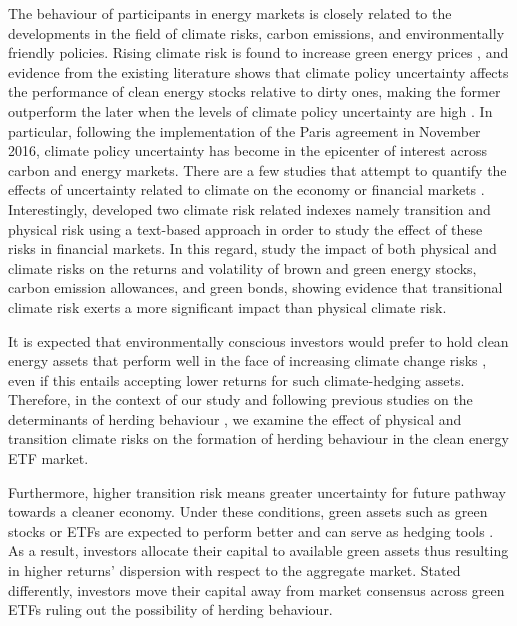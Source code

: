 \documentclass[
  letterpaper,
  DIV=11,
  numbers=noendperiod]{scrartcl}
\begin{document}
The behaviour of participants in energy markets is closely related to
the developments in the field of climate risks, carbon emissions, and
environmentally friendly policies. Rising climate risk is found to
increase green energy prices \citep{dutta2023}, and evidence from the
existing literature shows that climate policy uncertainty affects the
performance of clean energy stocks relative to dirty ones, making the
former outperform the later when the levels of climate policy
uncertainty are high \citep{bouri2022}. In particular, following the
implementation of the Paris agreement in November 2016, climate policy
uncertainty has become in the epicenter of interest across carbon and
energy markets. There are a few studies that attempt to quantify the
effects of uncertainty related to climate on the economy or financial
markets \citep[see inter alia,][]{gabriel2024, bolton2021, krueger2020}.
Interestingly, \citet{bua2024} developed two climate risk related
indexes namely transition and physical risk using a text-based approach
in order to study the effect of these risks in financial markets. In
this regard, \citet{bouri2023} study the impact of both physical and
climate risks on the returns and volatility of brown and green energy
stocks, carbon emission allowances, and green bonds, showing evidence
that transitional climate risk exerts a more significant impact than
physical climate risk.

It is expected that environmentally conscious investors would prefer to
hold clean energy assets that perform well in the face of increasing
climate change risks \citep[see][]{bouri2022}, even if this entails
accepting lower returns for such climate-hedging assets. Therefore, in
the context of our study and following previous studies on the
determinants of herding behaviour \citep[see][]{bouri2019, demirer2018},
we examine the effect of physical and transition climate risks on the
formation of herding behaviour in the clean energy ETF market.

Furthermore, higher transition risk means greater uncertainty for future
pathway towards a cleaner economy. Under these conditions, green assets
such as green stocks or ETFs are expected to perform better and can
serve as hedging tools \citep[see inter alia][]{pastor}. As a result,
investors allocate their capital to available green assets thus
resulting in higher returns' dispersion with respect to the aggregate
market. Stated differently, investors move their capital away from
market consensus across green ETFs ruling out the possibility of herding
behaviour.
\end{document}
